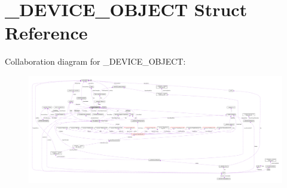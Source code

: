 \hypertarget{struct__DEVICE__OBJECT}{}\section{\+\_\+\+D\+E\+V\+I\+C\+E\+\_\+\+O\+B\+J\+E\+C\+T Struct Reference}
\label{struct__DEVICE__OBJECT}


Collaboration diagram for \+\_\+\+D\+E\+V\+I\+C\+E\+\_\+\+O\+B\+J\+E\+C\+T\+:
\nopagebreak
\begin{figure}[H]
\begin{center}
\leavevmode
\includegraphics[width=350pt]{struct__DEVICE__OBJECT__coll__graph}
\end{center}
\end{figure}
